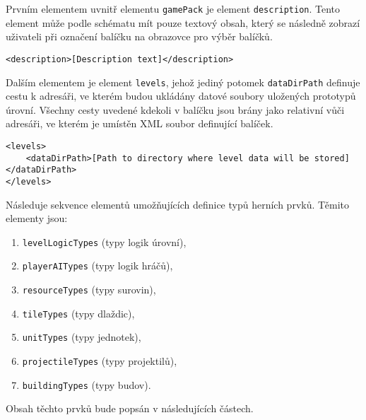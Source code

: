 Prvním elementem uvnitř elementu \texttt{gamePack} je element \texttt{description}. Tento element může podle schématu mít pouze textový obsah, který se následně zobrazí uživateli při označení balíčku na obrazovce pro výběr balíčků.
\begin{lstlisting}
<description>[Description text]</description>
\end{lstlisting}

Dalším elementem je element \texttt{levels}, jehož jediný potomek \texttt{dataDirPath} definuje cestu k adresáři, ve kterém budou ukládány datové soubory uložených prototypů úrovní. Všechny cesty uvedené kdekoli v balíčku jsou brány jako relativní vůči adresáři, ve kterém je umístěn XML soubor definující balíček.
\begin{lstlisting}
<levels>
	<dataDirPath>[Path to directory where level data will be stored]</dataDirPath>
</levels>
\end{lstlisting}

Následuje sekvence elementů umožňujících definice typů herních prvků. Těmito elementy jsou:

\begin{enumerate}
	\item \texttt{levelLogicTypes} (typy logik úrovní),
	\item \texttt{playerAITypes} (typy logik hráčů),
	\item \texttt{resourceTypes} (typy surovin),
	\item \texttt{tileTypes} (typy dlaždic),
	\item \texttt{unitTypes} (typy jednotek),
	\item \texttt{projectileTypes} (typy projektilů),
	\item \texttt{buildingTypes} (typy budov).
\end{enumerate}
Obsah těchto prvků bude popsán v následujících částech. 

